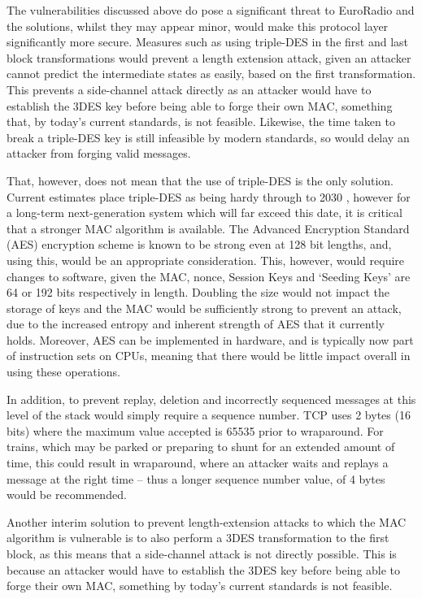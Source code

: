 \documentclass[twoside,11pt,a4paper]{article}
\begin{document}
The vulnerabilities discussed above do pose a significant threat to EuroRadio and the solutions, whilst they may appear minor, would make this protocol layer significantly more secure. Measures such as using triple-DES in the first and last block transformations would prevent a length extension attack, given an attacker cannot predict the intermediate states as easily, based on the first transformation. This prevents a side-channel attack directly as an attacker would have to establish the 3DES key before being able to forge their own MAC, something that, by today's current standards, is not feasible. Likewise, the time taken to break a triple-DES key is still infeasible by modern standards, so would delay an attacker from forging valid messages.

That, however, does not mean that the use of triple-DES is the only solution. Current estimates place triple-DES as being hardy through to 2030 \citep{NIST12a}, however for a long-term next-generation system which will far exceed this date, it is critical that a stronger MAC algorithm is available. The Advanced Encryption Standard (AES) encryption scheme is known to be strong even at 128 bit lengths, and, using this, would be an appropriate consideration. This, however, would require changes to software, given the MAC, nonce, Session Keys and `Seeding Keys' are 64 or 192 bits respectively in length. Doubling the size would not impact the storage of keys and the MAC would be sufficiently strong to prevent an attack, due to the increased entropy and inherent strength of AES that it currently holds. Moreover, AES can be implemented in hardware, and is typically now part of instruction sets on CPUs, meaning that there would be little impact overall in using these operations.

In addition, to prevent replay, deletion and incorrectly sequenced messages at this level of the stack would simply require a sequence number. TCP uses 2 bytes (16 bits) where the maximum value accepted is 65535 prior to wraparound. For trains, which may be parked or preparing to shunt for an extended amount of time, this could result in wraparound, where an attacker waits and replays a message at the right time -- thus a longer sequence number value, of 4 bytes would be recommended.

Another interim solution to prevent length-extension attacks to which the MAC algorithm is vulnerable is to also perform a 3DES transformation to the first block, as this means that a side-channel attack is not directly possible. This is because an attacker would have to establish the 3DES key before being able to forge their own MAC, something by today's current standards is not feasible.
\end{document}
